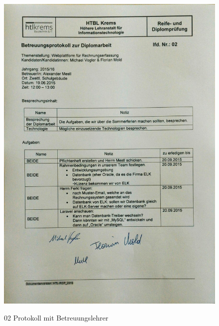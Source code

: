 \newpage
\begin{figure}[!h]
    \centering
    \includegraphics[width=13cm]{figures/Mestl_02.jpg}
    \label{fig:02_Protokoll_Betreuungslehrer}
    \caption{02 Protokoll mit Betreuungslehrer}
\end{figure}
\newpage
